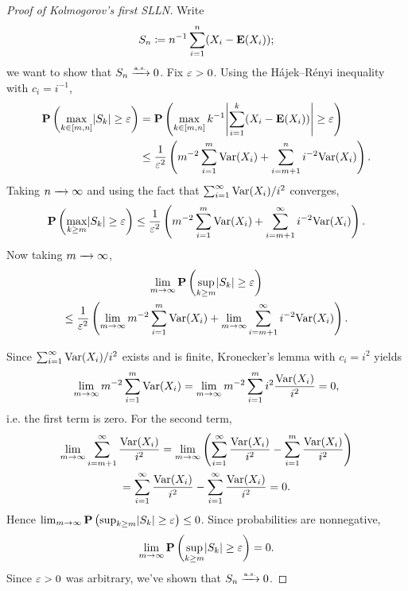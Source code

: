 \documentclass[11pt,letterpaper,reqno,oneside]{article}
\begin{document}
\begin{proof}[Proof of Kolmogorov's first SLLN]
	Write
	\begin{equation*}
		S_n \coloneqq n^{-1} \sum_{i=1}^n (X_i-\mathbf{E}(X_i)) ;
	\end{equation*}
	we want to show that $S_n \xrightarrow{{\scriptscriptstyle \mathrm{a.s.}}} 0$. Fix $\varepsilon>0$. Using the Hájek--Rényi inequality with $c_i = i^{-1}$,
	\begin{align*}
		\PP\left( \max_{k \in [m,n]}  
		\abs*{S_k} \geq \eps \right)
		={}& \PP\left( \max_{k \in [m,n]} k^{-1} 
		\abs*{\sum_{i=1}^k (X_i-\E(X_i))} \geq \eps \right)
		\\
		\leq{}& \frac{1}{\eps^2} \left( 
		m^{-2} \sum_{i=1}^m \Var(X_i) + \sum_{i=m+1}^n i^{-2} \Var(X_i)
		\right) .
	\end{align*}
	Taking $n \xrightarrow{\;\;\;} \infty$ and using the fact that $\sum_{i=1}^\infty \mathrm{Var}(X_i) / i^2$ converges,
	\begin{equation*}
		\PP\left( \max_{k \geq m} 
		\abs*{S_k} \geq \eps \right)
		\leq \frac{1}{\eps^2} \left( 
		m^{-2} \sum_{i=1}^m \Var(X_i) + \sum_{i=m+1}^\infty i^{-2} \Var(X_i)
		\right) .
	\end{equation*}
	Now taking $m \xrightarrow{\;\;\;} \infty$,
	\begin{multline*}
		\lim_{m\to\infty} \PP\left( \sup_{k \geq m} 
		\abs*{S_k} \geq \eps \right)
		\\
		\leq \frac{1}{\eps^2} \left( 
		\lim_{m\to\infty} m^{-2} \sum_{i=1}^m \Var(X_i)
		+ \lim_{m\to\infty} \sum_{i=m+1}^\infty i^{-2} \Var(X_i)
		\right) .
	\end{multline*}
	

	Since $\sum_{i=1}^\infty \mathrm{Var}(X_i) / i^2$ exists and is finite, Kronecker's lemma with $c_i = i^2$ yields
	\begin{equation*}
		\lim_{m\to\infty} m^{-2} \sum_{i=1}^m \mathrm{Var}(X_i) 
		= \lim_{m\to\infty} m^{-2} \sum_{i=1}^m i^2 \frac{\mathrm{Var}(X_i)}{i^2} 
		= 0 ,
	\end{equation*}
	i.e. the first term is zero. For the second term,
	\begin{multline*}
		\lim_{m\to\infty} \sum_{i=m+1}^\infty \frac{ \mathrm{Var}(X_i) }{i^2}
		= \lim_{m\to\infty} \left( 
		\sum_{i=1}^\infty \frac{ \mathrm{Var}(X_i) }{i^2}
		- \sum_{i=1}^m \frac{ \mathrm{Var}(X_i) }{i^2}
		\right)
		\\
		= \sum_{i=1}^\infty \frac{ \mathrm{Var}(X_i) }{i^2}
		- \sum_{i=1}^\infty \frac{ \mathrm{Var}(X_i) }{i^2}
		= 0 .
	\end{multline*}
	Hence $\lim_{m\to\infty} \PP\left( \sup_{k \geq m} \abs*{S_k} \geq \eps \right) \leq 0$. Since probabilities are nonnegative,
	\begin{equation*}
		\lim_{m\to\infty} \PP\left( \sup_{k \geq m} 
		\abs*{S_k} \geq \eps \right)
		= 0 .
	\end{equation*}
	Since $\varepsilon>0$ was arbitrary, we've shown that $S_n \xrightarrow{{\scriptscriptstyle \mathrm{a.s.}}} 0$.
\end{proof}
\end{document}
